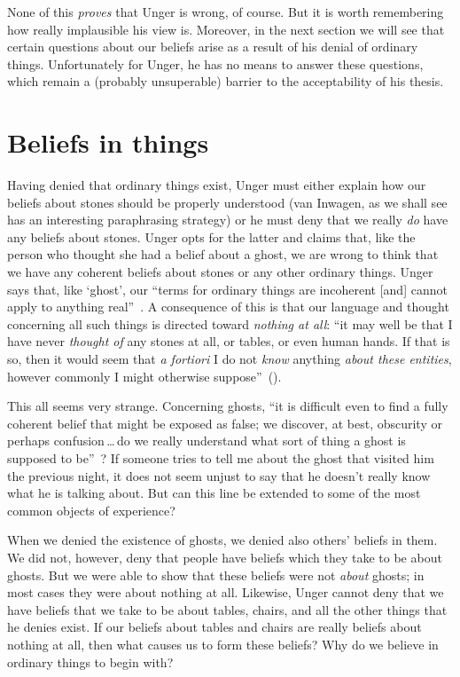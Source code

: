 \documentclass[11pt]{standalone} \newif\ifstandlone \standalonetrue
\begin{document}
\begin{spacing}{1.5}
\begin{enumerate}
None of this {\em proves} that Unger is wrong, of course.  But it is
worth remembering how really implausible his view is.  Moreover, in
the next section we will see that certain questions about our beliefs
arise as a result of his denial of ordinary things.  Unfortunately for
Unger, he has no means to answer these questions, which remain a
(probably unsuperable) barrier to the acceptability of his thesis.

\section{Beliefs in things}
Having denied that ordinary things exist, Unger must either explain
how our beliefs about stones should be properly understood (van
Inwagen, as we shall see has an interesting paraphrasing strategy) or
he must deny that we really {\em do} have any beliefs about stones.
Unger opts for the latter and claims that, like the person who thought
she had a belief about a ghost, we are wrong to think that we have
any coherent beliefs about stones or any other ordinary things.  Unger
says that, like `ghost', our ``terms for ordinary things are
incoherent [and] cannot apply to anything
real''~\citep[147]{unger1979}.  A consequence of this is that our
language and thought concerning all such things is directed toward
{\em nothing at all}: ``it may well be that I have never {\em thought
  of} any stones at all, or tables, or even human hands.  If that is
so, then it would seem that {\em a fortiori} I do not {\em know}
anything {\em about these entities}, however commonly I might
otherwise suppose''~(\citeyear[458]{unger1980a}).

This all seems very strange.  Concerning ghosts, ``it is difficult
even to find a fully coherent belief that might be exposed as false;
we discover, at best, obscurity or perhaps confusion\,\ldots\,do we
really understand what sort of thing a ghost is supposed to
be''~\citep[76]{stroud2000a}?  If someone tries to tell me about the
ghost that visited him the previous night, it does not seem unjust to
say that he doesn't really know what he is talking about.  But can
this line be extended to some of the most common objects of
experience?

When we denied the existence of ghosts, we denied also others' beliefs
in them.  We did not, however, deny that people have beliefs which
they take to be about ghosts.  But we were able to show that these
beliefs were not {\em about} ghosts; in most cases they were about
nothing at all.  Likewise, Unger cannot deny that we have beliefs that
we take to be about tables, chairs, and all the other things that he
denies exist.  If our beliefs about tables and chairs are really
beliefs about nothing at all, then what causes us to form these
beliefs?  Why do we believe in ordinary things to begin with?


\end{enumerate}
\end{spacing}
\end{document}
